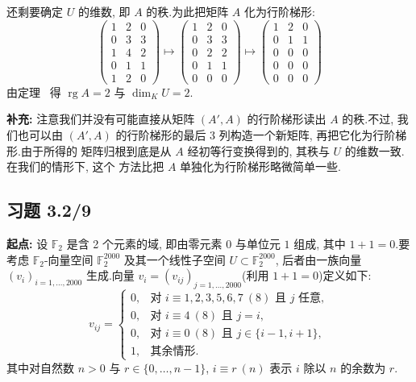 还剩要确定 $U$ 的维数, 即 $A$ 的秩.为此把矩阵 $A$ 化为行阶梯形:
\[
\begin{pmatrix} 1 & 2 & 0 \\ 0 & 3 & 3 \\ 1 & 4 & 2 \\ 0 & 1 & 1 \\ 1 & 2 & 0 \end{pmatrix}
\longmapsto \begin{pmatrix} 1 & 2 & 0 \\ 0 & 3 & 3 \\ 0 & 2 & 2 \\ 0 & 1 & 1 \\ 0 & 0 & 0 \end{pmatrix}
\longmapsto \begin{pmatrix} 1 & 2 & 0 \\ 0 & 1 & 1 \\ 0 & 0 & 0 \\ 0 & 0 & 0 \\ 0 & 0 & 0 \end{pmatrix}
\]
由定理~ 得 $\operatorname{rg} A = 2$ 与 $\dim_K U = 2$.

\noindent\textbf{补充:} 注意我们并没有可能直接从矩阵 $(A', A)$ 的行阶梯形读出 $A$ 的秩.不过,
我们也可以由 $(A', A)$ 的行阶梯形的最后 3 列构造一个新矩阵, 再把它化为行阶梯形.由于所得的
矩阵归根到底是从 $A$ 经初等行变换得到的, 其秩与 $U$ 的维数一致.在我们的情形下, 这个
方法比把 $A$ 单独化为行阶梯形略微简单一些.

\subsection*{习题 3.2/9}

\noindent\textbf{起点:} 设 $\mathbb{F}_2$ 是含 2 个元素的域, 即由零元素 $0$ 与单位元 $1$ 组成,
其中 $1 + 1 = 0$.要考虑 $\mathbb{F}_2$-向量空间 $\mathbb{F}_2^{2000}$ 及其一个线性子空间
$U \subset \mathbb{F}_2^{2000}$, 后者由一族向量 $(v_i)_{i = 1, \ldots, 2000}$ 生成.向量
$v_i = (v_{ij})_{j = 1, \ldots, 2000}$(利用 $1 + 1 = 0$)定义如下:
\[
v_{ij} = \begin{cases} 0, & \text{对 } i \equiv 1, 2, 3, 5, 6, 7 \ (8) \text{ 且 } j \text{ 任意}, \\ 0, & \text{对 } i \equiv 4 \ (8) \text{ 且 } j = i, \\ 0, & \text{对 } i \equiv 0 \ (8) \text{ 且 } j \in \{i - 1, i + 1\}, \\ 1, & \text{其余情形}. \end{cases}
\]
其中对自然数 $n > 0$ 与 $r \in \{0, \ldots, n - 1\}$, $i \equiv r \ (n)$ 表示 $i$ 除以 $n$
的余数为 $r$.

